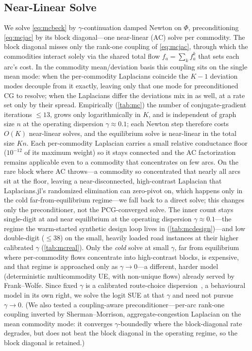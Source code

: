 \documentclass[ijoc]{informs3}
\begin{document}
\subsection{Near-Linear Solve}
We solve \cref{eq:mcbeck} by $\gamma$-continuation damped Newton on $\Phi$, preconditioning \cref{eq:mcjac} by its
block diagonal---one near-linear (AC) solve per commodity. The block diagonal misses only the rank-one coupling
of \cref{eq:mcjac}, through which the commodities interact solely via the shared total flow $f_a=\sum_k f^k_a$
that sets each arc's cost. In the commodity
mean/deviation basis this coupling sits on the single mean mode: when the per-commodity Laplacians coincide the
$K-1$ deviation modes decouple from it exactly, leaving only that one mode for preconditioned CG to resolve; when
the Laplacians differ the deviations mix in as well, at a rate set only by their spread. Empirically (\cref{tab:mc}) the number of conjugate-gradient iterations $\leq 13$,
grows only logarithmically in $K$, and is independent of graph size $n$ at the operating dispersion
$\gamma\approx0.1$; each Newton step therefore costs $O(K)$ near-linear solves, and the equilibrium solve is
near-linear in the total size $Kn$. Each per-commodity Laplacian carries a small relative conductance floor
($10^{-12}$ of its maximum weight) so it stays connected and the AC factorization remains
applicable even to a commodity that concentrates on few arcs. On the rare block where AC throws---a commodity so
concentrated that nearly all arcs sit at the floor, leaving a near-disconnected, high-contrast Laplacian that
Laplacians.jl's randomized elimination can zero-pivot on, which happens only in the cold far-from-equilibrium
regime---we fall back to a direct solve; this changes only the preconditioner, not the PCG-converged solve. The
inner count stays single-digit at and near equilibrium at the operating dispersion $\gamma\approx0.1$---the
regime the warm-started synthetic design loop lives in (\cref{tab:mcdesign})---and low double-digit ($\le38$)
on the small, heavily loaded road instances at their higher calibrated $\gamma$ (\cref{tab:mcreal}). Only the \emph{cold} solve at small $\gamma$, far from equilibrium where
per-commodity flows concentrate into high-contrast blocks, is expensive, and that regime is approached only as
$\gamma\to0$---a different, harder model (deterministic multicommodity UE, with non-unique flows) already
served by Frank--Wolfe. Since fixed $\gamma$ is a calibrated route-choice dispersion~\citep{fisk1980,daganzo1977},
a behavioural model in its own right, we solve the logit SUE at that $\gamma$ and need not pursue $\gamma\to0$.
(We also tested a coupling-aware preconditioner---per-arc rank-one coupling inverted by
Sherman--Morrison, aggregate-congestion Laplacian on the mean commodity mode: it converges
$\gamma$-boundedly where the block-diagonal rate degrades, but does not beat the block diagonal in the operating
regime, so the block diagonal is retained.)
\end{document}
